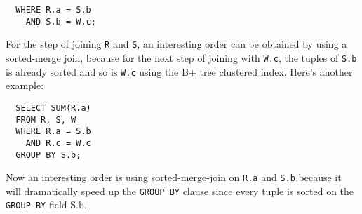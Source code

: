 \documentclass[10pt]{myland}
\begin{document}
\begin{enumerate}[label=\textbf{\arabic*.}, listparindent=0.0em, itemsep=1em]
\begin{lstlisting}
  WHERE R.a = S.b
    AND S.b = W.c;
    \end{lstlisting}
    For the step of joining \texttt{R} and \texttt{S}, an interesting order can be obtained by using a sorted-merge join, because for the 
    next step of joining with \texttt{W.c}, the tuples of \texttt{S.b} is already sorted and so is \texttt{W.c} using the B+ tree clustered
    index. Here's another example: \begin{lstlisting}
  SELECT SUM(R.a)
  FROM R, S, W
  WHERE R.a = S.b
    AND R.c = W.c
  GROUP BY S.b;
    \end{lstlisting}
    Now an interesting order is using sorted-merge-join on \texttt{R.a} and \texttt{S.b} because it will dramatically speed up the \texttt{GROUP BY}
    clause since every tuple is sorted on the \texttt{GROUP BY} field {S.b}.
     
\end{enumerate}
\end{document}
